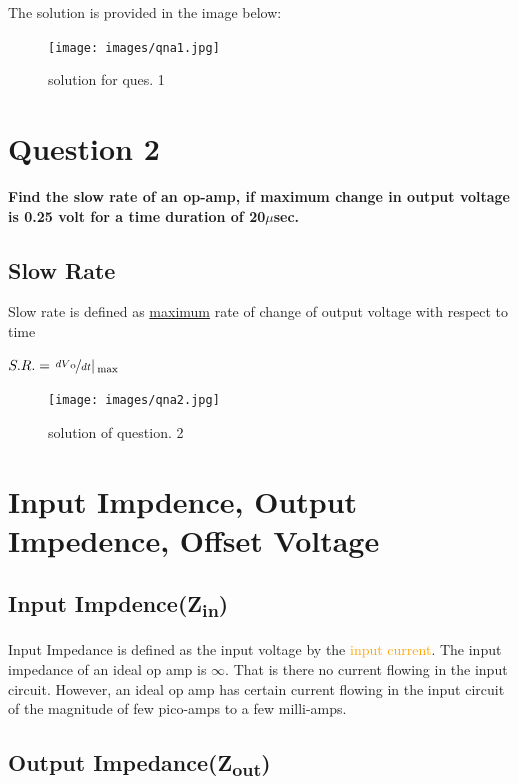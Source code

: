 \documentclass[11pt,a4paper,oneside]{article}
\begin{document}
The solution is provided in the image below:

\begin{figure}[hbt!]
	\centering
	\texttt{[image: images/qna1.jpg]}
	\caption{solution for ques. 1}
\end{figure}

\clearpage

\section{Question 2}
\noindent \large \textbf{Find the slow rate of an op-amp, if maximum change in output voltage is 0.25 volt for a time duration of 20$\mu$sec.}

\vskip 1cm

\subsection{Slow Rate}
Slow rate is defined as \underline{maximum} rate of change of output voltage with respect to time

\bgroup \bfseries
\begin{center}
	$S.R. = \left.\nicefrac{dV\textsubscript{o}}{dt}\right\vert\textsubscript{max}$
\end{center}
\egroup{}

\begin{figure}[hbt!]
	\centering
	\texttt{[image: images/qna2.jpg]}
	\caption{solution of question. 2}
\end{figure}

\clearpage

\section{Input Impdence, Output Impedence, Offset Voltage}

\subsection{Input Impdence(Z\textsubscript{in})}

Input Impedance is defined as the input voltage by the \textcolor{orange}{input current}. The input impedance of an ideal op amp is $\infty$. That is there no current flowing in the input circuit. However, an ideal op amp has certain current flowing in the input circuit of the magnitude of few pico-amps to a few milli-amps.

\subsection{Output Impedance(Z\textsubscript{out})}
\end{document}
